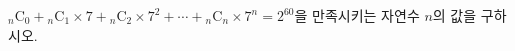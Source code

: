 ${}_n\mathrm{C}_0+{}_n\mathrm{C}_1\times 7+{}_n\mathrm{C}_2\times 7^2+\cdots+{}_n\mathrm{C}_n\times 7^n=2^{60}$을 만족시키는 자연수 $n$의 값을 구하시오.
